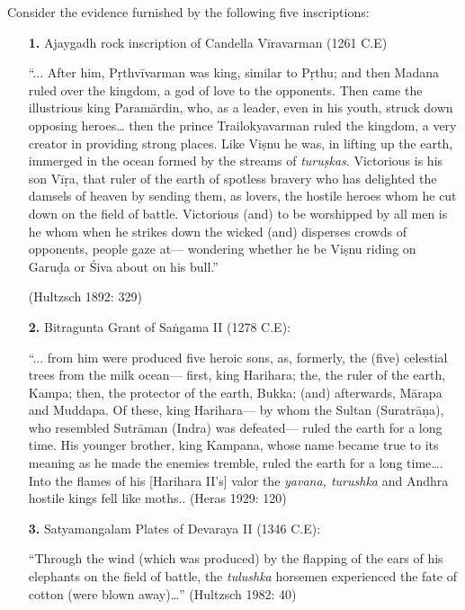 Consider the evidence furnished by the following five inscriptions: 
\begin{itemize}
\item[{\bf 1.}] Ajaygadh rock inscription of Candella Vīravarman (1261 C.E) 

“... After him, Pṛthvīvarman was king, similar to Pṛthu; and then Madana ruled over the kingdom, a god of love to the opponents. Then came the illustrious king Paramārdin, who, as a leader, even in his youth, struck down opposing heroes… then the prince Trailokyavarman ruled the kingdom, a very creator in providing strong places. Like Viṣnu he was, in lifting up the earth, immerged in the ocean formed by the streams of {\sl turuṣkas}. Victorious is his son Vīṛa, that ruler of the earth of spotless bravery who has delighted the damsels of heaven by sending them, as lovers, the hostile heroes whom he cut down on the field of battle. Victorious (and) to be worshipped by all men is he whom when he strikes down the wicked (and) disperses crowds of opponents, people gaze at— wondering whether he be Viṣnu riding on Garuḍa or Śiva about on his bull.” 

\hfill (Hultzsch 1892: 329)

\newpage

\item[{\bf 2.}] Bitragunta Grant of Saṅgama II (1278 C.E): 

“... from him were produced five heroic sons, as, formerly, the (five) celestial trees from the milk ocean— first, king Harihara; the, the ruler of the earth, Kampa; then, the protector of the earth, Bukka; (and) afterwards, Mārapa and Muddapa. Of these, king Harihara— by whom the Sultan (Suratrāṇa), who resembled Sutrāman (Indra) was defeated— ruled the earth for a long time. His younger brother, king Kampana, whose name became true to its meaning as he made the enemies tremble, ruled the earth for a long time…. Into the flames of his [Harihara II’s] valor the {\sl yavana, turushka} and Andhra hostile kings fell like moths.. (Heras 1929: 120) 

\item[{\bf 3.}] Satyamangalam Plates of Devaraya II (1346 C.E): 

“Through the wind (which was produced) by the flapping of the ears of his elephants on the field of battle, the {\sl tulushka} horsemen experienced the fate of cotton (were blown away)…” (Hultzsch 1982: 40)


\end{itemize}

